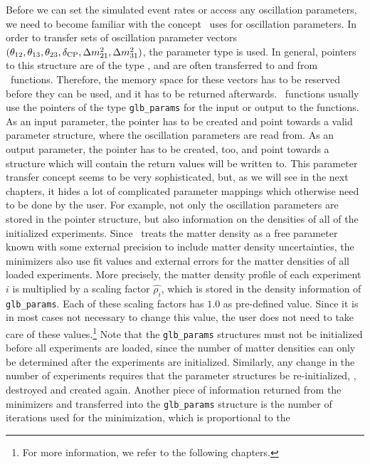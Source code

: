 Before we can set the simulated event rates or access any oscillation
parameters, we need to become familiar with the concept \GLOBES\ uses
for oscillation parameters. In order to transfer sets of oscillation
parameter vectors $(\theta_{12}, \theta_{13}, \theta_{23}, \delta_{\mathrm{CP}}, \Delta m_{21}^2, \Delta m_{31}^2)$, the parameter type  is used. In general, pointers to this structure are of the type , and are often
transferred to and from \GLOBES\ functions. Therefore, the memory space
for these vectors has to be reserved before they can be used, and it has
to be returned afterwards. \GLOBES\ functions usually use the pointers
of the type {\tt glb\_params} for the input or output to the functions. As
an input parameter, the pointer has to be created and point towards a valid
parameter structure, where the oscillation parameters are read from. As
an output parameter, the pointer has to be created, too, and point towards
a structure which will contain the return values will be written to.
This parameter transfer concept seems to be very sophisticated, but, as we
will see in the next chapters, it hides a lot of complicated parameter 
mappings which otherwise need to be done by the user. For example, not
only the oscillation parameters are stored in the pointer structure, but also information on the
densities of all of the initialized experiments. Since \GLOBES\ treats
the matter density as a free parameter known with some external precision
to include matter density uncertainties,
the minimizers also use fit values and external errors for the matter
densities of all loaded experiments. More precisely, the matter density
profile of each experiment $i$ is multiplied by a scaling factor
$\hat{\rho_i}$,  
which is stored in the density information of {\tt glb\_params}. Each of
these scaling factors has $1.0$ as pre-defined value. Since it
is in most cases not necessary to change this value, the user does
not need to take care of these values.\footnote{For more information,
we refer to the following chapters.}
Note that the {\tt glb\_params}
structures must not be initialized before all experiments are loaded,
since the number of matter densities can only be determined after the
experiments are initialized. 
Similarly, any change in the number of experiments requires that the
parameter structures be re-initialized, \ie, destroyed and created again.
Another piece of information returned from the minimizers and transferred
into the {\tt glb\_params} structure is the number
of iterations used for the minimization, which is proportional to the

